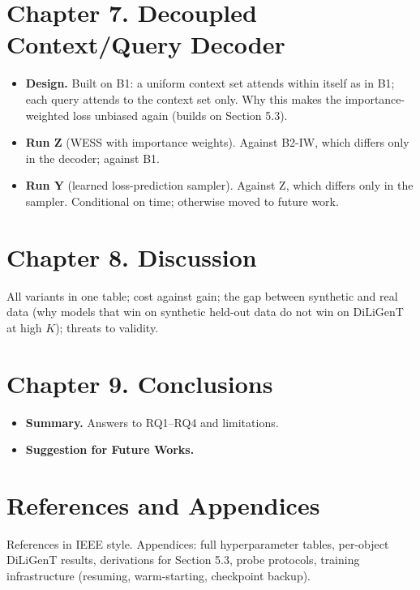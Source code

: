 \documentclass[Main.tex]{subfiles}
\begin{document}
\section*{Chapter 7. Decoupled Context/Query Decoder }
\begin{itemize}
  \item[7.1] \textbf{Design.} Built on B1: a uniform context set attends within itself as in B1;
    each query attends to the context set only. Why this makes the importance-weighted loss
    unbiased again (builds on Section 5.3).
  \item[7.2] \textbf{Run Z} (WESS with importance weights). Against B2-IW, which differs only in
    the decoder; against B1.
  \item[7.3] \textbf{Run Y} (learned loss-prediction sampler). Against Z, which differs only in
    the sampler. Conditional on time; otherwise moved to future work.
\end{itemize}

\section*{Chapter 8. Discussion}
All variants in one table; cost against gain; the gap between synthetic and real data (why models
that win on synthetic held-out data do not win on DiLiGenT at high $K$); threats to validity.

\section*{Chapter 9. Conclusions}
\begin{itemize}
  \item[9.1] \textbf{Summary.} Answers to RQ1--RQ4 and limitations.
  \item[9.2] \textbf{Suggestion for Future Works.}
\end{itemize}

\section*{References and Appendices}
References in IEEE style. Appendices: full hyperparameter tables, per-object DiLiGenT results,
derivations for Section 5.3, probe protocols, training infrastructure (resuming, warm-starting, checkpoint backup).
\end{document}

